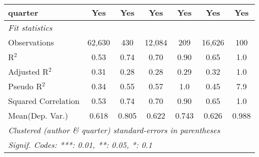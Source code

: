 \begin{tabular}{lcccccc}
   quarter                                                    & Yes           & Yes         & Yes            & Yes          & Yes           & Yes\\  
   \midrule
   \emph{Fit statistics}\\
   Observations                                               & 62,630        & 430         & 12,084         & 209          & 16,626        & 100\\  
   R$^2$                                                      & 0.53          & 0.74        & 0.70           & 0.90         & 0.65          & 1.0\\  
   Adjusted R$^2$                                             & 0.31          & 0.28        & 0.28           & 0.29         & 0.32          & 1.0\\  
   Pseudo R$^2$                                               & 0.34          & 0.55        & 0.57           & 1.0          & 0.45          & 7.9\\  
   Squared Correlation                                        & 0.53          & 0.74        & 0.70           & 0.90         & 0.65          & 1.0\\  
Mean(Dep. Var.) & 0.618 & 0.805 & 0.622 & 0.743 & 0.626 & 0.988 \\
   \midrule \midrule
   \multicolumn{7}{l}{\emph{Clustered (author \& quarter) standard-errors in parentheses}}\\
   \multicolumn{7}{l}{\emph{Signif. Codes: ***: 0.01, **: 0.05, *: 0.1}}\\
\end{tabular}
\par\endgroup
